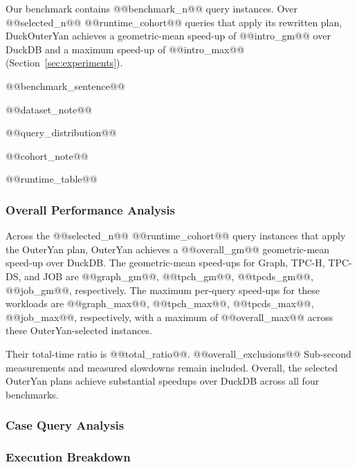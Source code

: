 Our benchmark contains @@benchmark_n@@ query instances. Over @@selected_n@@ @@runtime_cohort@@ queries that apply its rewritten plan, DuckOuterYan achieves a geometric-mean speed-up of @@intro_gm@@ over DuckDB and a maximum speed-up of @@intro_max@@ (Section~\ref{sec:experiments}).

@@benchmark_sentence@@

@@dataset_note@@

@@query_distribution@@

@@cohort_note@@

@@runtime_table@@

\subsubsection{Overall Performance Analysis}

Across the @@selected_n@@ @@runtime_cohort@@ query instances that apply the OuterYan plan, OuterYan achieves a @@overall_gm@@ geometric-mean speed-up over DuckDB. The geometric-mean speed-ups for Graph, TPC-H, TPC-DS, and JOB are @@graph_gm@@, @@tpch_gm@@, @@tpcds_gm@@, @@job_gm@@, respectively. The maximum per-query speed-ups for these workloads are @@graph_max@@, @@tpch_max@@, @@tpcds_max@@, @@job_max@@, respectively, with a maximum of @@overall_max@@ across these OuterYan-selected instances.

Their total-time ratio is @@total_ratio@@. @@overall_exclusions@@ Sub-second measurements and measured slowdowns remain included. Overall, the selected OuterYan plans achieve substantial speedups over DuckDB across all four benchmarks.

\subsubsection{Case Query Analysis}


\subsubsection{Execution Breakdown}
\label{sec:phase-breakdown}

